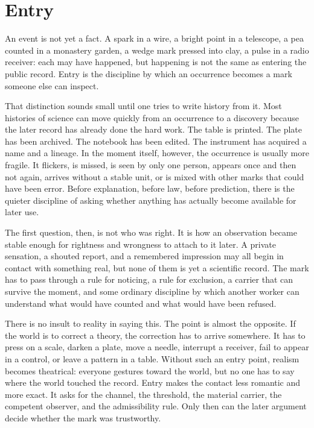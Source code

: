 \chapter{Entry}
\label{chap:entry}

\begin{chapteressay}
An event is not yet a fact. A spark in a wire, a bright point in a telescope, a
pea counted in a monastery garden, a wedge mark pressed into clay, a pulse in a
radio receiver: each may have happened, but happening is not the same as entering
the public record. Entry is the discipline by which an occurrence becomes a mark
someone else can inspect.

That distinction sounds small until one tries to write history from it. Most
histories of science can move quickly from an occurrence to a discovery because
the later record has already done the hard work. The table is printed. The plate
has been archived. The notebook has been edited. The instrument has acquired a
name and a lineage. In the moment itself, however, the occurrence is usually
more fragile. It flickers, is missed, is seen by only one person, appears once
and then not again, arrives without a stable unit, or is mixed with other marks
that could have been error. Before explanation, before law, before prediction,
there is the quieter discipline of asking whether anything has actually become
available for later use.

The first question, then, is not who was right. It is how an observation became
stable enough for rightness and wrongness to attach to it later. A private
sensation, a shouted report, and a remembered impression may all begin in
contact with something real, but none of them is yet a scientific record. The
mark has to pass through a rule for noticing, a rule for exclusion, a carrier
that can survive the moment, and some ordinary discipline by which another
worker can understand what would have counted and what would have been refused.

There is no insult to reality in saying this. The point is almost the opposite.
If the world is to correct a theory, the correction has to arrive somewhere. It
has to press on a scale, darken a plate, move a needle, interrupt a receiver,
fail to appear in a control, or leave a pattern in a table. Without such an
entry point, realism becomes theatrical: everyone gestures toward the world, but
no one has to say where the world touched the record. Entry makes the contact
less romantic and more exact. It asks for the channel, the threshold, the
material carrier, the competent observer, and the admissibility rule. Only then
can the later argument decide whether the mark was trustworthy.


\end{chapteressay}
